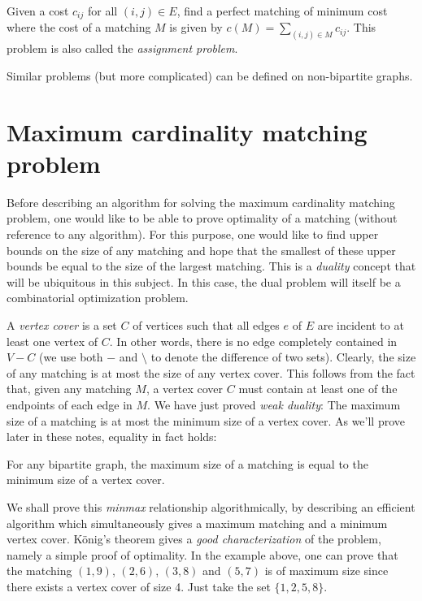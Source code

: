 \documentclass[12pt]{article}
\begin{document}
\medskip
{} Given a cost
$c_{ij}$ for all $(i,j)\in E$, find a perfect matching of minimum cost
where the cost of a matching $M$ is given by $c(M)=\sum_{(i,j)\in M}
c_{ij}$. This problem is also called the {\it assignment problem}.

\medskip
Similar problems (but more complicated) can be defined on
non-bipartite graphs. 


\section{Maximum cardinality matching problem}

Before describing an algorithm for solving the maximum cardinality
matching problem, one would like to be able to prove optimality of a
matching (without reference to any algorithm). For this purpose, one
would like to find upper bounds on the size of any matching and hope
that the smallest of these upper bounds be equal to the size of the
largest matching. This is a {\it duality} concept that will be ubiquitous in
this subject. In this case, the dual problem will itself be a
combinatorial optimization problem. 

A {\it vertex cover} is a set $C$ of vertices such that all edges $e$
of $E$ are incident to at least one vertex of $C$. In other words,
there is no edge completely contained in $V-C$ (we use both $-$ and
$\setminus$ to denote the difference of two sets). Clearly, the size
of any matching is at most the size of any vertex cover. This follows
from the fact that, given any matching $M$, a vertex cover $C$ must
contain at least one of the endpoints of each edge in $M$. We have
just proved {\it weak duality}: The maximum size of a matching is at
most the minimum size of a vertex cover. As we'll prove later in these
notes, equality in fact holds:
\begin{theorem}[K\"onig 1931]
For any bipartite graph, the maximum size of a matching is equal to
the minimum size of a vertex cover. 
\end{theorem}

We shall prove this {\it minmax} relationship algorithmically, by
describing an efficient algorithm which simultaneously gives a maximum
matching and a minimum vertex cover. K\"onig's theorem gives a {\it
good characterization} of the problem, namely a simple proof of
optimality.  In the example above, one can prove that the matching
$(1,9)$, $(2,6)$, $(3,8)$ and $(5,7)$ is of maximum size since there
exists a vertex cover of size 4. Just take the set $\{1,2,5,8\}$.
\end{document}
